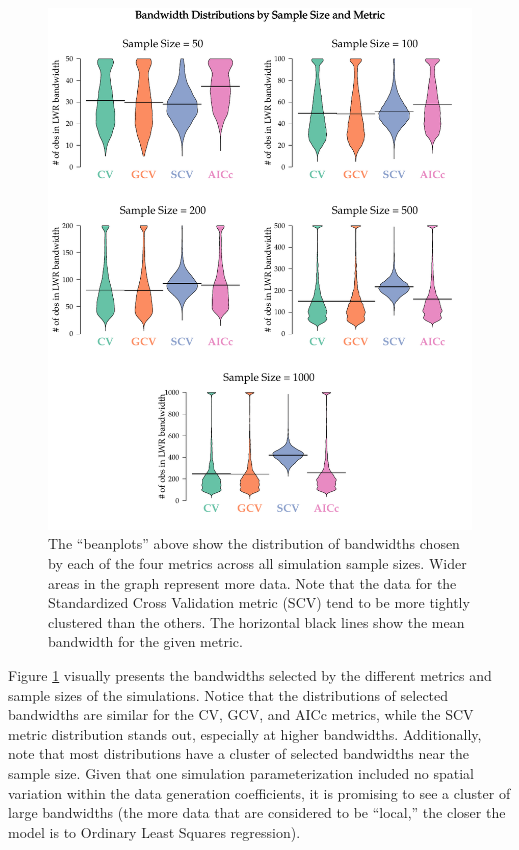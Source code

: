 \documentclass{article}\usepackage{graphicx, color}
\begin{document}
\begin{figure}\label{fig:beanplots}
\includegraphics{figure/beanplots.pdf}
\caption{The ``beanplots'' above show the distribution of bandwidths chosen by each of the four metrics across all simulation sample sizes. Wider areas in the graph represent more data. Note that the data for the Standardized Cross Validation metric (SCV) tend to be more tightly clustered than the others. The horizontal black lines show the mean bandwidth for the given metric.}
\end{figure}

Figure \ref{fig:beanplots} visually presents the bandwidths selected by the different metrics and sample sizes of the simulations. Notice that the distributions of selected bandwidths are similar for the CV, GCV, and AICc metrics, while the SCV metric distribution stands out, especially at higher bandwidths. Additionally, note that most distributions have a cluster of selected bandwidths near the sample size. Given that one simulation parameterization included no spatial variation within the data generation coefficients, it is promising to see a cluster of large bandwidths (the more data that are considered to be ``local,'' the closer the model is to Ordinary Least Squares regression). 
\end{document}

